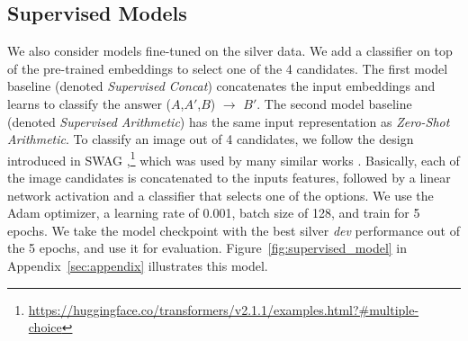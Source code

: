 \documentclass[letterpaper]{article} \usepackage{aaai23}  \usepackage{times}  \usepackage{helvet}  \usepackage{courier}  \usepackage[hyphens]{url}  \usepackage{graphicx} \urlstyle{rm} \def\UrlFont{\rm}  \usepackage{natbib}  \usepackage{caption} \frenchspacing  \setlength{\pdfpagewidth}{8.5in}  \setlength{\pdfpageheight}{11in}  \usepackage{algorithm}
\newcommand{\zeroshot}[0]{\emph{Zero-Shot Arithmetic}}
\newcommand{\trainedarithmetic}[0]{\emph{Supervised Arithmetic}}
\newcommand{\trainedconcat}[0]{\emph{Supervised Concat}}
\begin{document}
\subsection{Supervised Models} 
We also consider models fine-tuned on the silver data. We add a classifier on top of the pre-trained embeddings to select one of the 4 candidates. The first model baseline (denoted \trainedconcat{}) concatenates the input embeddings and learns to classify the answer ($A$,$A'$,$B$) $\rightarrow$ $B'$. The second model baseline (denoted \trainedarithmetic{}) has the same input representation as \zeroshot{}. To classify an image out of 4 candidates, we follow the design introduced in SWAG \cite{zellers2018swag},\footnote{\url{https://huggingface.co/transformers/v2.1.1/examples.html?#multiple-choice}} which was used by many similar works \cite{sun2019dream,huang2019cosmos,liang2019new,dzendzik2021english}. Basically, each of the image candidates is concatenated to the inputs features, followed by a linear network activation and a classifier that selects one of the options. We use the Adam \cite{kingma2014adam} optimizer, a learning rate of 0.001, batch size of 128, and train for 5 epochs. We take the model checkpoint with the best silver \emph{dev} performance out of the 5 epochs, and use it for evaluation. Figure~\ref{fig:supervised_model} in Appendix~\ref{sec:appendix} illustrates this model.
\end{document}
